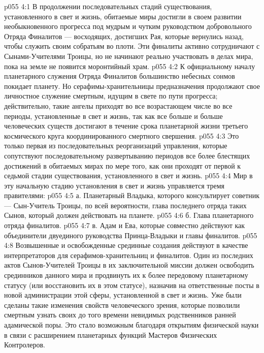 \vs p055 4:1 В продолжении последовательных стадий существования, установленного в свет и жизнь, обитаемые миры достигли в своем развитии необыкновенного прогресса под мудрым и чутким руководством добровольного Отряда Финалитов --- восходящих, достигших Рая, которые вернулись назад, чтобы служить своим собратьям во плоти. Эти финалиты активно сотрудничают с Сынами\hyp{}Учителями Троицы, но не начинают реально участвовать в делах мира, пока на земле не появится моронтийный храм.
\vs p055 4:2 К официальному началу планетарного служения Отряда Финалитов большинство небесных сонмов покидает планету. Но серафимы\hyp{}хранительницы предназначения продолжают свое личностное служение смертным, идущим в свете по пути прогресса; действительно, такие ангелы приходят во все возрастающем числе во все периоды, установленные в свет и жизнь, так как все больше и больше человеческих существ достигают в течение срока планетарной жизни третьего космического круга координированного смертного свершения.
\vs p055 4:3 Это только первая из последовательных реорганизаций управления, которые сопутствуют последовательному развертыванию периодов все более блестящих достижений в обитаемых мирах по мере того, как они проходят от первой к седьмой стадии существования, установленного в свет и жизнь.
\vs p055 4:4 \pc {}\bibnobreakspace {} Мир в эту начальную стадию установления в свет и жизнь управляется тремя правителями:
\vs p055 4:5 а. Планетарный Владыка, которого консультирует советник --- Сын\hyp{}Учитель Троицы, по всей вероятности, глава последнего отряда таких Сынов, который должен действовать на планете.
\vs p055 4:6 б. Глава планетарного отряда финалитов.
\vs p055 4:7 в. Адам и Ева, которые совместно действуют как объединители двуединого руководства Принца\hyp{}Владыки и главы финалитов.
\vs p055 4:8 \pc Возвышенные и освобожденные срединные создания действуют в качестве интерпретаторов для серафимов\hyp{}хранительниц и финалитов. Один из последних актов Сынов\hyp{}Учителей Троицы в их заключительной миссии должен освободить срединников данного мира и продвинуть их к более передовому планетарному статусу (или восстановить их в этом статусе), назначив на ответственные посты в новой администрации этой сферы, установленной в свет и жизнь. Уже были сделаны такие изменения свойств человеческого зрения, которые позволили смертным узнать своих до того времени невидимых родственников ранней адамической поры. Это стало возможным благодаря открытиям физической науки в связи с расширением планетарных функций Мастеров Физических Контролеров.
